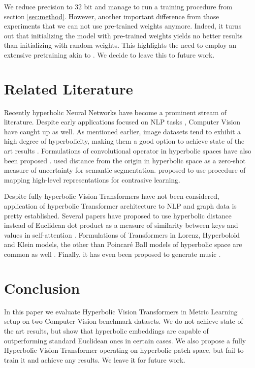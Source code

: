 \documentclass[10pt, letterpaper, twocolumn]{article}
\begin{document}
We reduce precision to 32 bit and manage to run a training procedure from section \ref{sec:method}. However, another important difference from those experiments that we can not use pre-trained weights anymore. Indeed, it turns out that initializing the model with pre-trained weights yields no better results than initializing with random weights. This highlights the need to employ an extensive pretraining akin to \cite{dosovitskiy_image_2021,caron_emerging_2021,oquab_dinov2_2023}. We decide to leave this to future work.

\section{Related Literature}\label{sec:ref}

Recently hyperbolic Neural Networks have become a prominent stream of literature. Despite early applications focused on NLP tasks \cite{ganea_hyperbolic_2018}, Computer Vision have caught up as well. As mentioned earlier, image datasets tend to exhibit a high degree of hyperbolicity, making them a good option to achieve state of the art results \cite{khrulkov_hyperbolic_2020,ermolov_hyperbolic_2022}. Formulations of convolutional operator in hyperbolic spaces have also been proposed \cite{atigh_hyperbolic_2022, bdeir_hyperbolic_2023, lensink_fully_2022}. \cite{chen_hyperbolic_2022} used distance from the origin in hyperbolic space as a zero-shot measure of uncertainty for semantic segmentation. \cite{yue_hyperbolic_2023} proposed to use procedure of mapping high-level representations for contrasive learning.

Despite fully hyperbolic Vision Transformers have not been considered, application of hyperbolic Transformer architecture to NLP and graph data is pretty established. Several papers have proposed to use hyperbolic distance instead of Euclidean dot product as a measure of similarity between keys and values in self-attention \cite{lopez_fully_2020, gulcehre_hyperbolic_2018, zhang_hyperbolic_2022,shimizu_hyperbolic_2021}. Formulations of Transformers in Lorenz, Hyperboloid and Klein models, the other than Poincar\'e Ball models of hyperbolic space are common as well \cite{liu_thg_2021, chen_fully_2022, nickel_learning_2018}. Finally, it has even been proposed to generate music \cite{huang_hyperbolic_2023}.

\section{Conclusion}\label{sec:concl}

In this paper we evaluate Hyperbolic Vision Transformers in Metric Learning setup on two Computer Vision benchmark datasets. We do not achieve state of the art results, but show that hyperbolic embeddings are capable of outperforming standard Euclidean ones in certain cases. We also propose a fully Hyperbolic Vision Transformer operating on hyperbolic patch space, but fail to train it and achieve any results. We leave it for future work.



\end{document}
